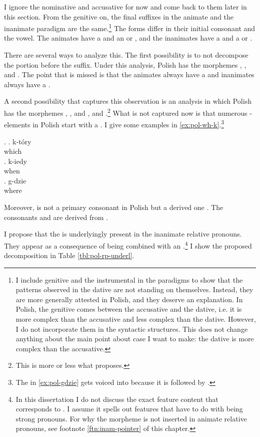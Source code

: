 I ignore the nominative and accusative for now and come back to them later in this section.
From the genitive on, the final suffixes in the animate and the inanimate paradigm are the same.\footnote{
I include genitive and the instrumental in the paradigms to show that the patterns observed in the dative are not standing on themselves. Instead, they are more generally attested in Polish, and they deserve an explanation.
In Polish, the genitive comes between the accusative and the dative, i.e. it is more complex than the accusative and less complex than the dative. However, I do not incorporate them in the syntactic structures.
This does not change anything about the main point about case I want to make: the dative is more complex than the accusative.
}
The forms differ in their initial consonant and the vowel. The animates have a  and an  or , and the inanimates have a  and a  or .

There are several ways to analyze this.
The first possibility is to not decompose the portion before the suffix. Under this analysis, Polish has the morphemes , ,  and . The point that is missed is that the animates always have a  and inanimates always have a .

A second possibility that captures this observation is an analysis in which Polish has the morphemes , ,  and ,  and .\footnote{
This is more or less what \citet{wiland2019} proposes.
}
What is not captured now is that numerous -elements in Polish start with a . I give some examples in \ref{ex:pol-wh-k}.\footnote{
The  in \ref{ex:pol-gdzie} gets voiced into  because it is followed by .
}

\ex.\label{ex:pol-wh-k}
\ag. k-tóry\\
 which\\
\bg. k-iedy\\
 when\\
\bg. g-dzie\\
 where\\\label{ex:pol-gdzie}

Moreover,  is not a primary consonant in Polish but a derived one . The consonants  and  are derived from .

I propose that the  is underlyingly present in the inanimate relative pronouns. They appear as a consequence of being combined with an .\footnote{
In this dissertation I do not discuss the exact feature content that corresponds to . I assume it spells out features that have to do with being strong pronouns. For why the morpheme is not inserted in animate relative pronouns, see footnote \ref{ftn:inam-pointer} of this chapter.
}
I show the proposed decomposition in Table \ref{tbl:pol-rp-underl}.

